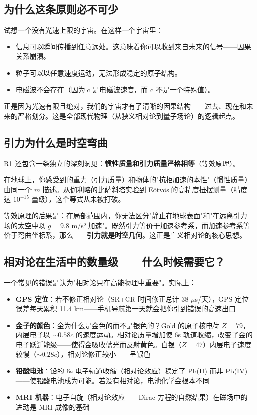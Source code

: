 \subsection{为什么这条原则必不可少}

试想一个没有光速上限的宇宙。在这样一个宇宙里：
\begin{itemize}
  \item 信息可以瞬间传播到任意远处。这意味着你可以收到来自未来的信号——因果关系崩溃。
  \item 粒子可以以任意速度运动，无法形成稳定的原子结构。
  \item 电磁波不会存在（因为 c 是电磁波速度，而 c 不是一个特殊值）。
\end{itemize}

\noindent 正是因为光速有限且绝对，我们的宇宙才有了清晰的因果结构——过去、现在和未来的严格划分。这是全部现代物理（从狭义相对论到量子场论）的逻辑起点。

\subsection{引力为什么是时空弯曲}

R1 还包含一条独立的深刻洞见：\textbf{惯性质量和引力质量严格相等}（等效原理）。

在地球上，你感受到的重力（引力质量）和物体的"抗拒加速的本性"（惯性质量）由同一个 $m$ 描述。从伽利略的比萨斜塔实验到 Eötvös 的高精度扭摆测量（精度达 $10^{-15}$ 量级），这个等式从未被打破。

等效原理的后果是：在局部范围内，你无法区分"静止在地球表面"和"在远离引力场的太空中以 $g=9.8$ m/s² 加速"。既然引力等价于加速参考系，而加速参考系等价于弯曲坐标系，那么——\textbf{引力就是时空几何}。这正是广义相对论的核心思想。

\subsection{相对论在生活中的数量级——什么时候需要它？}

一个常见的错误是认为"相对论只在高能物理中重要"。实际上：

\begin{itemize}
\item \textbf{GPS 定位}：若不修正相对论（SR+GR 时间修正总计 38 $\mu$s/天），GPS 定位误差每天累积 11.4 km——手机导航第一天就会把你引到错误的高速出口
\item \textbf{金子的颜色}：金为什么是金色的而不是银色的？Gold 的原子核电荷 $Z=79$，内层电子以 $\sim 0.58c$ 的速度运动。相对论质量增加使 6s 轨道收缩，改变了金的电子跃迁能级——使得金吸收蓝光而反射黄色。白银（$Z=47$）内层电子速度较慢（$\sim 0.28c$），相对论修正较小——呈银色
\item \textbf{铅酸电池}：铅的 6s 电子轨道收缩（相对论效应）稳定了 Pb(II) 而非 Pb(IV)——使铅酸电池成为可能。若没有相对论，电池化学会根本不同
\item \textbf{MRI 机器}：电子自旋（相对论效应——Dirac 方程的自然结果）在磁场中的进动是 MRI 成像的基础
\end{itemize}

